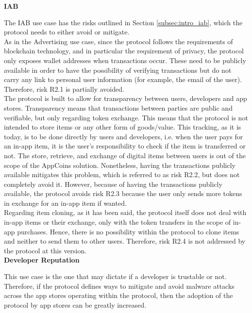 {\bf IAB}

The IAB use case has the risks outlined in Section \ref{subsec:intro_iab}, which the protocol needs to either avoid or mitigate. \\

As in the Advertising use case, since the protocol follows the requirements of blockchain technology, and in particular the requirement of privacy, the protocol only exposes wallet addresses when transactions occur. These need to be publicly available in order to have the possibility of verifying transactions but do not carry any link to personal user information (for example, the email of the user). Therefore, risk \textsf{R2.1} is partially avoided. \\

The protocol is built to allow for transparency between users, developers and app stores. Transparency means that transactions between parties are public and verifiable, but only regarding token exchange. This means that the protocol is not intended to store items or any other form of goods/value. This tracking, as it is today, is to be done directly by users and developers, i.e. when the user pays for an in-app item, it is the user's responsibility to check if the item is transferred or not. The store, retrieve, and exchange of digital items between users is out of the scope of the AppCoins solution. Nonetheless, having the transactions publicly available mitigates this problem, which is referred to as risk \textsf{R2.2}, but does not completely avoid it. However, because of having the transactions publicly available, the protocol avoids risk \textsf{R2.3} because the user only sends more tokens in exchange for an in-app item if wanted. \\

Regarding item cloning, as it has been said, the protocol itself does not deal with in-app items or their exchange, only with the token transfers in the scope of in-app purchases. Hence, there is no possibility within the protocol to clone items and neither to send them to other users. Therefore, risk \textsf{R2.4} is not addressed by the protocol at this version.\\


{\bf Developer Reputation}

This use case is the one that may dictate if a developer is trustable or not. Therefore, if the protocol defines ways to mitigate and avoid malware attacks across the app stores operating within the protocol, then the adoption of the protocol by app stores can be greatly increased. \\

